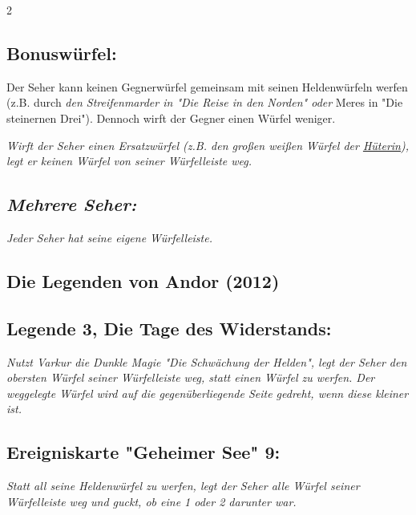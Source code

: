 \documentclass[10pt, a4paper, oneside]{book}
\newcommand{\fan}[1]{\textit{#1}}
\begin{document}
\begin{multicols*}{2}
\begin{nobgcolor}
\columnbreak


\subsection{Bonuswürfel:}

Der Seher kann keinen Gegnerwürfel gemeinsam mit seinen Heldenwürfeln werfen (z.B. durch \fan{den Streifenmarder in "Die Reise in den Norden" oder} Meres in "Die steinernen Drei"\supercite{ag-begleitheft}). Dennoch wirft der Gegner einen Würfel weniger.

\fan{Wirft der Seher einen Ersatzwürfel (z.B. den großen weißen Würfel der \hyperref[hueterin]{Hüterin}), legt er keinen Würfel von seiner Würfelleiste weg.}
\supercite{49630}






\subsection{\fan{Mehrere Seher:}}

\fan{Jeder Seher hat seine eigene Würfelleiste.}




\end{nobgcolor}



\begin{bgcolor}
\section{Die Legenden von Andor (2012)}


\subsection{Legende 3, Die Tage des Widerstands:}

\fan{Nutzt Varkur die Dunkle Magie "Die Schwächung der Helden", legt der Seher den obersten Würfel seiner Würfelleiste weg, statt einen Würfel zu werfen. Der weggelegte Würfel wird auf die gegenüberliegende Seite gedreht, wenn diese kleiner ist.}



\subsection{Ereigniskarte "Geheimer See" 9:}

\fan{Statt all seine Heldenwürfel zu werfen, legt der Seher alle Würfel seiner Würfelleiste weg und guckt, ob eine 1 oder 2 darunter war.}



\end{bgcolor}
\end{multicols*}
\end{document}
